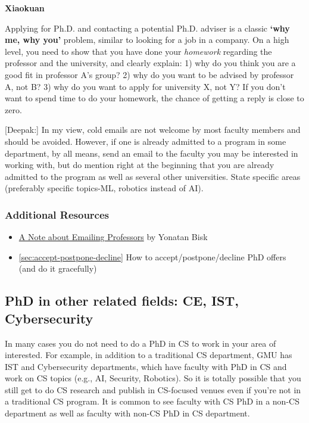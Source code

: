 \documentclass[oneside,11pt]{memoir}
\newenvironment{commentbox}[1][]{
  \small
  \begin{mybox}
    {\small \textbf{#1}}
  }{
  \end{mybox}
}
\begin{document}
\begin{commentbox}[Xiaokuan]
  Applying for Ph.D. and contacting a potential Ph.D. adviser is a classic \textbf{`why me, why you'} problem,
  similar to looking for a job in a company.
  On a high level,
  you need to show that you have done your \emph{homework}
  regarding the professor and the university,
  and clearly explain:
  1) why do you think you are a good fit in professor A's group?
  2) why do you want to be advised by professor A, not B?
  3) why do you want to apply for university X, not Y?
  If you don't want to spend time to do your homework,
  the chance of getting a reply is close to zero.
\end{commentbox}


\begin{commentbox}
  [Deepak:]
  In my view, cold emails are not welcome by most faculty members and should be avoided. However, if one is already admitted to a program in some department, by all means, send an email to the faculty you may be interested in working with, but do mention right at the beginning that you are already admitted to the program as well as several other universities. State specific areas (preferably specific topics-ML, robotics instead of AI).
\end{commentbox}

\subsubsection*{Additional Resources}
\begin{itemize}
  \item \href{https://yonatanbisk.com/emailing_professors.html}{A Note about Emailing Professors} by Yonatan Bisk
  \item \autoref{sec:accept-postpone-decline} How to accept/postpone/decline PhD offers (and do it gracefully)
\end{itemize}

\subsection{PhD in other related fields: CE, IST, Cybersecurity}\label{sec:related-fields}

In many cases you do not need to do a PhD in CS to work in your area of interested. For example, in addition to a traditional CS department, GMU has IST and Cybersecurity departments, which have faculty  with PhD in CS and work on CS topics (e.g., AI, Security, Robotics).  So it is totally possible that you still get to do CS research and publish in CS-focused venues even if you're not in a traditional CS program.  It is  common to see faculty with CS PhD in a non-CS department as well as faculty with non-CS PhD in CS department.  
\end{document}
